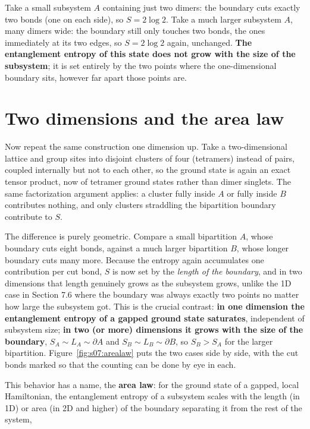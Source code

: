 Take a small subsystem $A$ containing just two dimers: the boundary cuts exactly two bonds (one on each
side), so $S = 2\log 2$. Take a much larger subsystem $A$, many dimers wide: the boundary still only
touches two bonds, the ones immediately at its two edges, so $S = 2\log 2$ again, unchanged. \textbf{The
entanglement entropy of this state does not grow with the size of the subsystem}; it is set entirely
by the two points where the one-dimensional boundary sits, however far apart those points are.

\section{Two dimensions and the area law}

Now repeat the same construction one dimension up. Take a two-dimensional lattice and group sites into
disjoint clusters of four (tetramers) instead of pairs, coupled internally but not to each other, so
the ground state is again an exact tensor product, now of tetramer ground states rather than dimer
singlets. The same factorization argument applies: a cluster fully inside $A$ or fully inside $B$
contributes nothing, and only clusters straddling the bipartition boundary contribute to $S$.

The difference is purely geometric. Compare a small bipartition $A$, whose boundary cuts eight bonds,
against a much larger bipartition $B$, whose longer boundary cuts many more. Because the entropy again
accumulates one contribution per cut bond, $S$ is now set by the \emph{length of the boundary}, and in two
dimensions that length genuinely grows as the subsystem grows, unlike the 1D case in Section 7.6 where
the boundary was always exactly two points no matter how large the subsystem got. This is the crucial
contrast: \textbf{in one dimension the entanglement entropy of a gapped ground state saturates}, independent
of subsystem size; \textbf{in two (or more) dimensions it grows with the size of the boundary}, $S_A \sim
L_A \sim \partial A$ and $S_B \sim L_B \sim \partial B$, so $S_B > S_A$ for the larger bipartition.
Figure~\ref{fig:s07:arealaw} puts the two cases side by side, with the cut bonds marked so that the
counting can be done by eye in each.



This behavior has a name, the \textbf{area law}: for the ground state of a gapped, local Hamiltonian, the
entanglement entropy of a subsystem scales with the length (in 1D) or area (in 2D and higher) of the
boundary separating it from the rest of the system,

